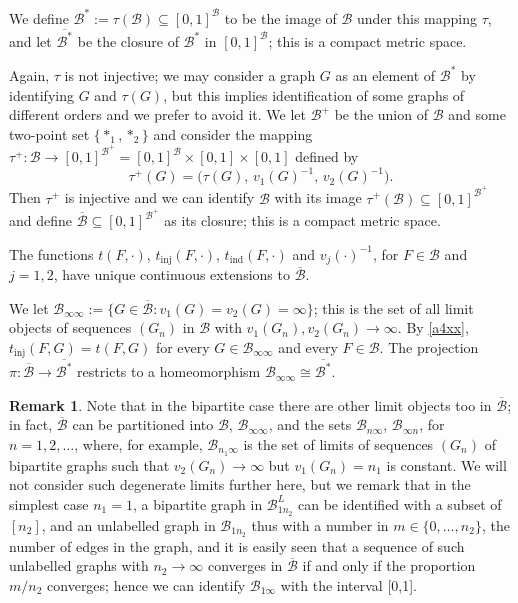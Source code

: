 \documentclass[11pt,reqno,tbtags]{amsart}
\numberwithin{equation}{section}
\theoremstyle{definition}
\newtheorem{remark}{Remark}[section]
\theoremstyle{remark}
\newcommand\set[1]{\ensuremath{\{#1\}}}
\newcommand\bigpar[1]{\bigl(#1\bigr)}
\newcommand\cB{\mathcal B}
\newcommand\qw{^{-1}}
\renewcommand{\=}{:=}
\newcommand\oi{[0,1]}
\newcommand{\tinj}{t_{\mathrm{inj}}}
\newcommand{\tind}{t_{\mathrm{ind}}}
\newcommand{\tauu}{\tau^+}
\newcommand{\BUxx}[2]{\cB_{#1#2}}
\newcommand{\BLxx}[2]{\cB^L_{#1#2}}
\newcommand{\cbx}{\cB^*}
\newcommand{\cbxq}{\overline{\cbx}}
\newcommand{\cbq}{\overline{\cB}}
\newcommand{\cbb}{\cB^+}
\newcommand{\cboo}{\BUxx{\infty}{\infty}}
\newcommand{\oib}{\oi^{\cB}}
\newcommand{\oibb}{\oi^{\cbb}}
\begin{document}
We define $\cbx\=\tau(\cB)\subseteq\oib$ to be the image of $\cB$
under this mapping $\tau$, and let $\cbxq$ be the closure of $\cbx$ in
$\oib$; this is
a compact metric space.

Again, $\tau$ is not injective; we may
consider a graph $G$ as an element of $\cbx$ by identifying $G$ and
$\tau(G)$, but this implies identification of some
graphs of different orders and 
we prefer to avoid it.
We let
$\cbb$ be the union of $\cB$ and some two-point set \set{*_1,*_2} and
consider the mapping $\tauu:\cB\to\oibb=\oib\times\oi\times\oi$ defined by
\begin{equation}\label{tab+}
  \tauu(G)=\bigpar{\tau(G),\,v_1(G)\qw,\,v_2(G)\qw}.
\end{equation}
Then $\tauu$ is injective
and we can identify $\cB$ with its image $\tauu(\cB)\subseteq\oibb$
and define $\cbq\subseteq\oibb$ as its closure; this is a compact
metric space.

The functions $t(F,\cdot)$,
$\tinj(F,\cdot)$, $\tind(F,\cdot)$ and %
$v_j(\cdot)\qw$, for $F\in\cB$ and $j=1,2$, 
have unique continuous
extensions to $\cbq$.

We let $\cboo\=\set{G\in\cbq:v_1(G)=v_2(G)=\infty}$; 
this is the set of all limit objects of sequences
$(G_n)$ in $\cB$ with $v_1(G_n),v_2(G_n)\to\infty$.
By \eqref{a4xx}, $\tinj(F,G)=t(F,G)$ for every $G\in\cboo$
and every $F\in\cB$. The projection $\pi:\cbq\to\cbxq$ restricts to a
homeomorphism $\cboo\cong\cbxq$.

\begin{remark}
Note that in the bipartite case there are other limit objects too in
$\cbq$; in fact,  $\cbq$ can be partitioned into $\cB$, $\cboo$, and the sets
$\BUxx{n}{\infty}$, $\BUxx{\infty}n$, for $n=1,2,\dots$, where, for
example, 
$\BUxx{n_1}{\infty}$ is the set of limits of sequences $(G_n)$ of
bipartite graphs such that $v_2(G_n)\to\infty$ but $v_1(G_n)=n_1$ is constant.
We will not consider such degenerate limits further here, but we
remark that in the simplest case $n_1=1$, a bipartite graph in $\BLxx{1}{n_2}$
can be identified with a subset of $[n_2]$, and an unlabelled graph in
$\BUxx{1}{n_2}$ thus with a number in $m\in\set{0,\dots,n_2}$, the number of
edges in the graph, and it is easily seen that a sequence of such
unlabelled graphs with $n_2\to\infty$ converges in $\cbq$ if and only
if the proportion $m/n_2$ converges; hence we can identify 
$\BUxx{1}{\infty}$ with the interval \oi.  
\end{remark}
\end{document}
